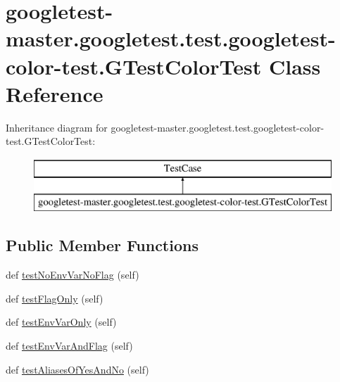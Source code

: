 \hypertarget{classgoogletest-master_1_1googletest_1_1test_1_1googletest-color-test_1_1_g_test_color_test}{}\section{googletest-\/master.googletest.\+test.\+googletest-\/color-\/test.G\+Test\+Color\+Test Class Reference}
\label{classgoogletest-master_1_1googletest_1_1test_1_1googletest-color-test_1_1_g_test_color_test}
Inheritance diagram for googletest-\/master.googletest.\+test.\+googletest-\/color-\/test.G\+Test\+Color\+Test\+:\begin{figure}[H]
\begin{center}
\leavevmode
\includegraphics[height=2.000000cm]{d9/d0e/classgoogletest-master_1_1googletest_1_1test_1_1googletest-color-test_1_1_g_test_color_test}
\end{center}
\end{figure}
\subsection*{Public Member Functions}
\begin{DoxyCompactItemize}
\item 
def \mbox{\hyperlink{classgoogletest-master_1_1googletest_1_1test_1_1googletest-color-test_1_1_g_test_color_test_acc862a7a8bcc353eaa8929db15ad942b}{test\+No\+Env\+Var\+No\+Flag}} (self)
\item 
def \mbox{\hyperlink{classgoogletest-master_1_1googletest_1_1test_1_1googletest-color-test_1_1_g_test_color_test_a1907c7a11b17a593c060c8b9c63e3421}{test\+Flag\+Only}} (self)
\item 
def \mbox{\hyperlink{classgoogletest-master_1_1googletest_1_1test_1_1googletest-color-test_1_1_g_test_color_test_a60eb7180f5e53a6a85e3f2d3012cd58c}{test\+Env\+Var\+Only}} (self)
\item 
def \mbox{\hyperlink{classgoogletest-master_1_1googletest_1_1test_1_1googletest-color-test_1_1_g_test_color_test_aea5d72a945a546b81ae97639ae80f3ef}{test\+Env\+Var\+And\+Flag}} (self)
\item 
def \mbox{\hyperlink{classgoogletest-master_1_1googletest_1_1test_1_1googletest-color-test_1_1_g_test_color_test_a27b5fd0ce30b1f23007650eb1b515857}{test\+Aliases\+Of\+Yes\+And\+No}} (self)
\end{DoxyCompactItemize}


